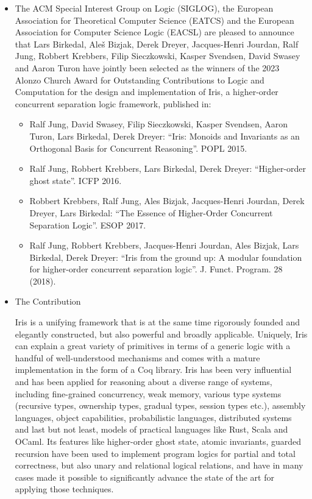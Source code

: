 \documentclass[prodmode,acmtecs]{acmsmall} %
\begin{document}
\begin{itemize}\item   The ACM Special Interest Group on Logic (SIGLOG), the European Association for Theoretical Computer Science (EATCS) and the European Association for Computer Science Logic (EACSL) are pleased to announce that Lars Birkedal, Aleš Bizjak, Derek Dreyer, Jacques-Henri Jourdan, Ralf Jung, Robbert Krebbers, Filip Sieczkowski, Kasper Svendsen, David Swasey and Aaron Turon have jointly been selected as the winners of the 2023 Alonzo Church Award for Outstanding Contributions to Logic and Computation for the design and implementation of Iris, a higher-order concurrent separation logic framework, published in: 
 
\begin{itemize}\item  Ralf Jung, David Swasey, Filip Sieczkowski, Kasper Svendsen, Aaron Turon, Lars Birkedal, Derek Dreyer: “Iris: Monoids and Invariants as an Orthogonal Basis for Concurrent Reasoning”. POPL 2015.
\item  Ralf Jung, Robbert Krebbers, Lars Birkedal, Derek Dreyer: “Higher-order ghost state”. ICFP 2016.
\item  Robbert Krebbers, Ralf Jung, Ales Bizjak, Jacques-Henri Jourdan, Derek Dreyer, Lars Birkedal: “The Essence of Higher-Order Concurrent Separation Logic”. ESOP 2017.
\item  Ralf Jung, Robbert Krebbers, Jacques-Henri Jourdan, Ales Bizjak, Lars Birkedal, Derek Dreyer: “Iris from the ground up: A modular foundation for higher-order concurrent separation logic”. J. Funct. Program. 28 (2018).
\end{itemize} 
\item  The Contribution 
 
  Iris is a unifying framework that is at the same time rigorously founded and elegantly constructed, but also powerful and broadly applicable. Uniquely, Iris can explain a great variety of primitives in terms of a generic logic with a handful of well-understood mechanisms and comes with a mature implementation in the form of a Coq library. Iris has been very influential and has been applied for reasoning about a diverse range of systems, including fine-grained concurrency, weak memory, various type systems (recursive types, ownership types, gradual types, session types etc.), assembly languages, object capabilities, probabilistic languages, distributed systems and last but not least, models of practical languages like Rust, Scala and OCaml. Its features like higher-order ghost state, atomic invariants, guarded recursion have been used to implement program logics for partial and total correctness, but also unary and relational logical relations, and have in many cases made it possible to significantly advance the state of the art for applying those techniques. 
 

\end{itemize}
\end{document}
